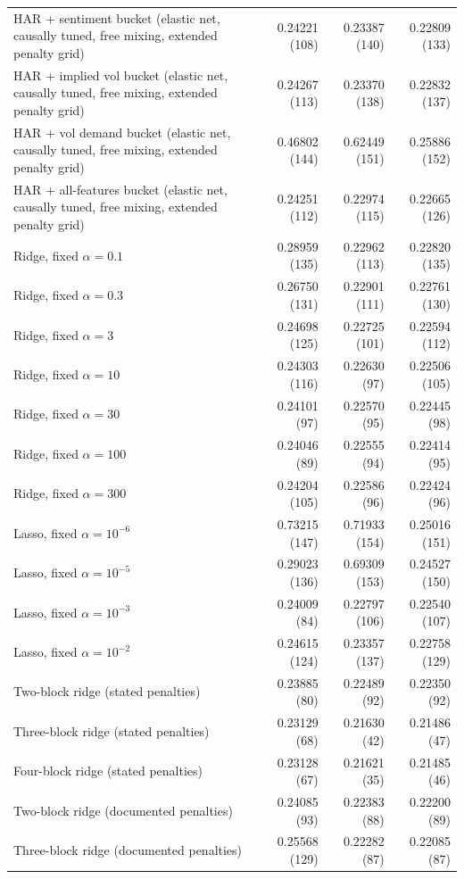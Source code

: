 \begin{longtable}{p{}rrr}
HAR + sentiment bucket (elastic net, causally tuned, free mixing, extended penalty grid) & 0.24221 (108) & 0.23387 (140) & 0.22809 (133) \\
HAR + implied vol bucket (elastic net, causally tuned, free mixing, extended penalty grid) & 0.24267 (113) & 0.23370 (138) & 0.22832 (137) \\
HAR + vol demand bucket (elastic net, causally tuned, free mixing, extended penalty grid) & 0.46802 (144) & 0.62449 (151) & 0.25886 (152) \\
HAR + all-features bucket (elastic net, causally tuned, free mixing, extended penalty grid) & 0.24251 (112) & 0.22974 (115) & 0.22665 (126) \\
Ridge, fixed $\alpha=0.1$ & 0.28959 (135) & 0.22962 (113) & 0.22820 (135) \\
Ridge, fixed $\alpha=0.3$ & 0.26750 (131) & 0.22901 (111) & 0.22761 (130) \\
Ridge, fixed $\alpha=3$ & 0.24698 (125) & 0.22725 (101) & 0.22594 (112) \\
Ridge, fixed $\alpha=10$ & 0.24303 (116) & 0.22630 (97) & 0.22506 (105) \\
Ridge, fixed $\alpha=30$ & 0.24101 (97) & 0.22570 (95) & 0.22445 (98) \\
Ridge, fixed $\alpha=100$ & 0.24046 (89) & 0.22555 (94) & 0.22414 (95) \\
Ridge, fixed $\alpha=300$ & 0.24204 (105) & 0.22586 (96) & 0.22424 (96) \\
Lasso, fixed $\alpha=10^{-6}$ & 0.73215 (147) & 0.71933 (154) & 0.25016 (151) \\
Lasso, fixed $\alpha=10^{-5}$ & 0.29023 (136) & 0.69309 (153) & 0.24527 (150) \\
Lasso, fixed $\alpha=10^{-3}$ & 0.24009 (84) & 0.22797 (106) & 0.22540 (107) \\
Lasso, fixed $\alpha=10^{-2}$ & 0.24615 (124) & 0.23357 (137) & 0.22758 (129) \\
Two-block ridge (stated penalties) & 0.23885 (80) & 0.22489 (92) & 0.22350 (92) \\
Three-block ridge (stated penalties) & 0.23129 (68) & 0.21630 (42) & 0.21486 (47) \\
Four-block ridge (stated penalties) & 0.23128 (67) & 0.21621 (35) & 0.21485 (46) \\
Two-block ridge (documented penalties) & 0.24085 (93) & 0.22383 (88) & 0.22200 (89) \\
Three-block ridge (documented penalties) & 0.25568 (129) & 0.22282 (87) & 0.22085 (87) \\

\end{longtable}
